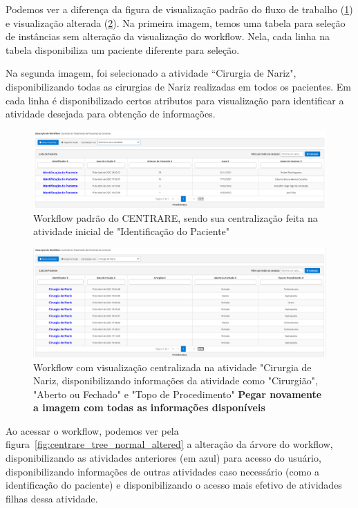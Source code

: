 Podemos ver a diferença da figura de visualização padrão do fluxo de trabalho (\ref{fig:normalInstance}) e visualização alterada (\ref{fig:changedInstance}). Na primeira imagem, temos uma tabela para seleção de instâncias sem alteração da visualização do workflow. Nela, cada linha na tabela disponibiliza um paciente diferente para seleção.

Na segunda imagem, foi selecionado a atividade ``Cirurgia de Nariz", disponibilizando todas as cirurgias de Nariz realizadas em todos os pacientes. Em cada linha é disponibilizado certos atributos para visualização para identificar a atividade desejada para obtenção de informações.

\begin{figure}
    \centering
    \includegraphics[width=1\textwidth]{imgs/CENTRARE/instanciaNormal.png}
    \caption{Workflow padrão do CENTRARE, sendo sua centralização feita na atividade inicial de "Identificação do Paciente"}
    \label{fig:normalInstance}
\end{figure}

\begin{figure}
    \centering
    \includegraphics[width=1\textwidth]{imgs/CENTRARE/instanciaAlterada.png}
    \caption{Workflow com visualização centralizada na atividade "Cirurgia de Nariz, disponibilizando informações da atividade como "Cirurgião", "Aberto ou Fechado" e "Topo de Procedimento" \textbf{Pegar novamente a imagem com todas as informações disponíveis}}
    \label{fig:changedInstance}
\end{figure}

Ao acessar o workflow, podemos ver pela figura~\ref{fig:centrare_tree_normal_altered} a alteração da árvore do workflow, disponibilizando as atividades anteriores (em azul) para acesso do usuário, disponibilizando informações de outras atividades caso necessário (como a identificação do paciente) e disponibilizando o acesso mais efetivo de atividades filhas dessa atividade.

